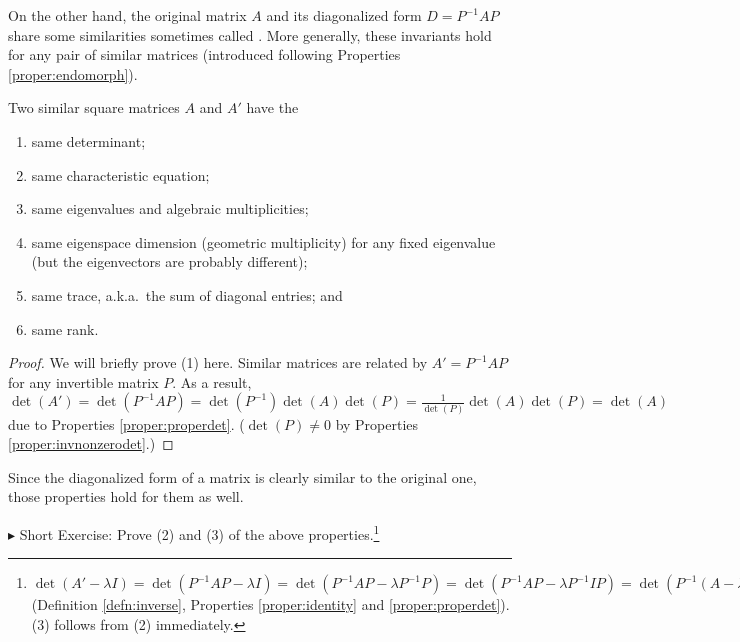 On the other hand, the original matrix $A$ and its diagonalized form $D = P^{-1}AP$ share some similarities sometimes called . More generally, these invariants hold for any pair of similar matrices (introduced following Properties \ref{proper:endomorph}). 
\begin{proper}
\label{proper:similarinvariant}
Two similar square matrices $A$ and $A'$ have the
\begin{enumerate}
\item same determinant;
\item same characteristic equation;
\item same eigenvalues and algebraic multiplicities;
\item same eigenspace dimension (geometric multiplicity) for any fixed eigenvalue (but the eigenvectors are probably different);
\item same trace, a.k.a.\ the sum of diagonal entries; and
\item same rank.
\end{enumerate}
\end{proper}
\begin{proof}
We will briefly prove (1) here. Similar matrices are related by $A' = P^{-1}AP$ for any invertible matrix $P$. As a result, $\det(A') = \det(P^{-1}AP) = \det(P^{-1})\det(A)\det(P) = \frac{1}{\det(P)}\det(A)\det(P) = \det(A)$ due to Properties \ref{proper:properdet}. ($\det(P) \neq 0$ by Properties \ref{proper:invnonzerodet}.)
\end{proof}
Since the diagonalized form of a matrix is clearly similar to the original one, those properties hold for them as well.\par
$\blacktriangleright$ Short Exercise: Prove (2) and (3) of the above properties.\footnote{$\det(A'-\lambda I) = \det(P^{-1}AP-\lambda I) = \det(P^{-1}AP-\lambda P^{-1}P) = \det(P^{-1}AP-\lambda P^{-1}IP) = \det(P^{-1}(A-\lambda I)P) = \det(P^{-1})\det(A-\lambda I)\det(P) = \det(A-\lambda I)$ (Definition \ref{defn:inverse}, Properties \ref{proper:identity} and \ref{proper:properdet}). (3) follows from (2) immediately.}\par


